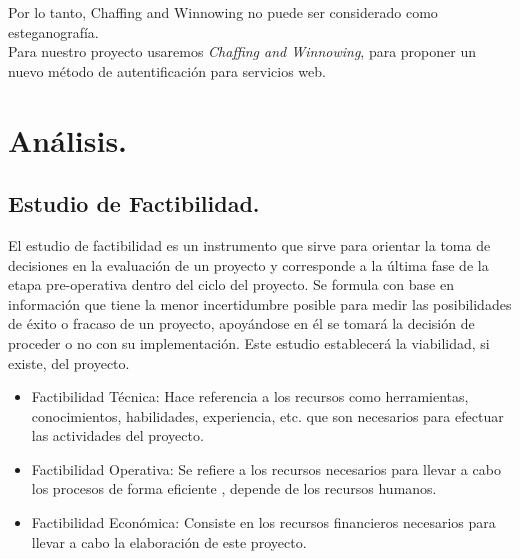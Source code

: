 \documentclass[12pt, a4paper, titlepage]{report}
\begin{document}
        Por lo tanto, Chaffing and Winnowing no puede ser considerado como esteganograf\'ia.\\
        
         Para nuestro proyecto usaremos \textit{Chaffing and Winnowing}, para proponer un nuevo método de autentificación para servicios web. \\
       
	\chapter{\textcolor{azulescom}{Análisis.}}
	    
    	\section{Estudio de Factibilidad.}
    	El estudio de factibilidad es un instrumento que sirve para orientar la toma de decisiones en la evaluación de un proyecto y corresponde a la última fase de la etapa pre-operativa dentro del ciclo del proyecto. Se formula con base en información que tiene la menor incertidumbre posible para medir las posibilidades de éxito o fracaso de un proyecto, apoyándose en él se tomará la decisión de proceder o no con su implementación. Este estudio establecerá la viabilidad, si existe, del proyecto.
    	\begin{itemize}
    	    \item Factibilidad Técnica: Hace referencia a los recursos como herramientas, conocimientos, habilidades, experiencia, etc. que son necesarios para efectuar las actividades del proyecto.
    	    \item Factibilidad Operativa: Se refiere a los recursos necesarios para llevar a cabo los procesos de forma eficiente , depende de los recursos humanos.
    	    \item Factibilidad Econ\'omica: Consiste en los recursos financieros necesarios para llevar a cabo la elaboraci\'on de este proyecto.
    	\end{itemize}
\end{document}
